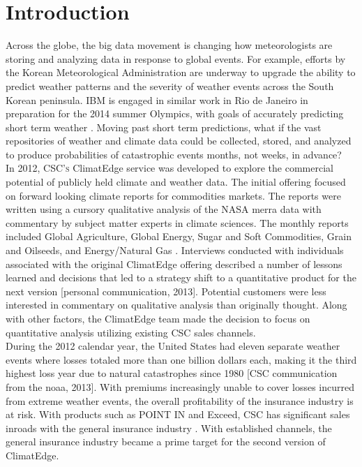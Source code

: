 \section{Introduction}
Across the globe, the big data movement is changing how meteorologists are storing and analyzing data in response to global events. For example, efforts by the Korean Meteorological Administration are underway to upgrade the ability to predict weather patterns and the severity of weather events across the South Korean peninsula. IBM is engaged in similar work in Rio de Janeiro in preparation for the 2014 summer Olympics, with goals of accurately predicting short term weather \cite{rwe}. Moving past short term predictions, what if the vast repositories of weather and climate data could be collected, stored, and analyzed to produce probabilities of catastrophic events months, not weeks, in advance?\\

In 2012, \textsc{CSC's} ClimatEdge\texttrademark{} service was developed to explore the commercial potential of publicly held climate and weather data. The initial offering focused on forward looking climate reports for commodities markets. The reports were written using a cursory qualitative analysis of the NASA \gls{merra} data with commentary by subject matter experts in climate sciences. The monthly reports included Global Agriculture, Global Energy, Sugar and Soft Commodities, Grain and Oilseeds, and Energy/Natural Gas \cite{climatedgeurl}. Interviews conducted with individuals associated with the original ClimatEdge offering described a number of lessons learned and decisions that led to a strategy shift to a quantitative product for the next version [personal communication, 2013]. Potential customers were less interested in commentary on qualitative analysis than originally thought. Along with other factors, the ClimatEdge team made the decision to focus on quantitative analysis utilizing existing CSC sales channels.\\

During the 2012 calendar year, the United States had eleven separate weather events where losses totaled more than one billion dollars each, making it the third highest loss year due to natural catastrophes since 1980 [\textsc{CSC} communication from the \gls{noaa}, 2013]. With premiums increasingly unable to cover losses incurred from extreme weather events, the overall profitability of the insurance industry is at risk. With products such as POINT IN  and Exceed, \textsc{CSC} has significant sales inroads with the general insurance industry \cite{point_in} \cite{exceed}. With established channels, the general insurance industry became a prime target for the second version of ClimatEdge.\\

